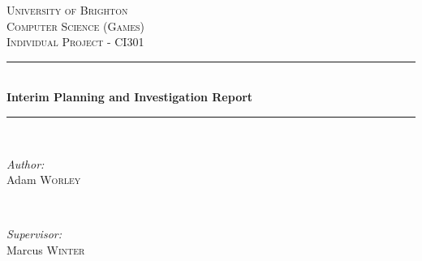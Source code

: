 \begin{titlepage}

\newcommand{\HRule}{\rule{\linewidth}{0.5mm}} %

\center %


\textsc{\LARGE University of Brighton}\\[1.5cm] %
\textsc{\Large Computer Science (Games)}\\[0.5cm] %
\textsc{\large Individual Project - CI301}\\[0.5cm] %


\HRule \\[0.4cm]
{ \huge \bfseries Interim Planning and Investigation Report}\\[0.4cm] %
\HRule \\[1.5cm]


\begin{minipage}{0.4\textwidth}
\begin{flushleft} \large
\emph{Author:}\\
Adam \textsc{Worley} %
\end{flushleft}
\end{minipage}
~
\begin{minipage}{0.4\textwidth}
\begin{flushright} \large
\emph{Supervisor:} \\
Marcus \textsc{Winter} %
\end{flushright}
\end{minipage}\\[3cm]



\end{titlepage}
